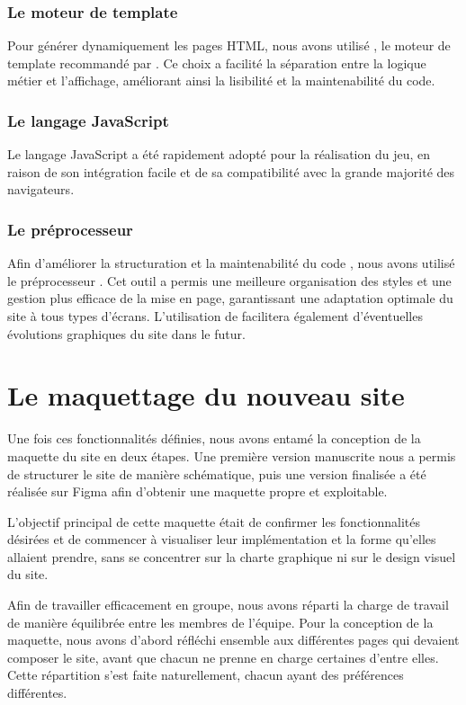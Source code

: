 \subsubsection*{Le moteur de template }

Pour générer dynamiquement les pages HTML, nous avons utilisé , le moteur de template recommandé par . Ce choix a facilité la séparation entre la logique métier et l'affichage, améliorant ainsi la lisibilité et la maintenabilité du code.

\subsubsection*{Le langage JavaScript}

Le langage JavaScript a été rapidement adopté pour la réalisation du jeu, en raison de son intégration facile et de sa compatibilité avec la grande majorité des navigateurs.

\subsubsection*{Le préprocesseur }

Afin d’améliorer la structuration et la maintenabilité du code , nous avons utilisé le préprocesseur . Cet outil a permis une meilleure organisation des styles et une gestion plus efficace de la mise en page, garantissant une adaptation optimale du site à tous types d’écrans. L’utilisation de  facilitera également d’éventuelles évolutions graphiques du site dans le futur.


\section{Le maquettage du nouveau site}

Une fois ces fonctionnalités définies, nous avons entamé la conception de la maquette du site en deux étapes. Une première version manuscrite nous a permis de structurer le site de manière schématique, puis une version finalisée a été réalisée sur Figma afin d’obtenir une maquette propre et exploitable.

L'objectif principal de cette maquette était de confirmer les fonctionnalités désirées et de commencer à visualiser leur implémentation et la forme qu'elles allaient prendre, sans se concentrer sur la charte graphique ni sur le design visuel du site.

Afin de travailler efficacement en groupe, nous avons réparti la charge de travail de manière équilibrée entre les membres de l'équipe. Pour la conception de la maquette, nous avons d'abord réfléchi ensemble aux différentes pages qui devaient composer le site, avant que chacun ne prenne en charge certaines d’entre elles. Cette répartition s’est faite naturellement, chacun ayant des préférences différentes.

